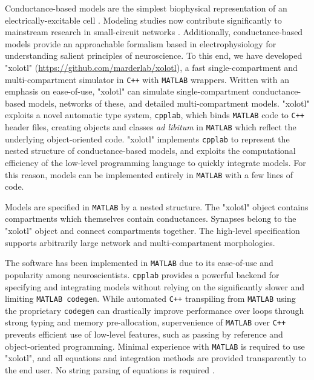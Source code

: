 \documentclass{frontiersSCNS} %
\begin{document}
Conductance-based models are the simplest biophysical representation of an electrically-excitable cell \autocite{hodgkinQuantitativeDescriptionMembrane1952}. Modeling studies now contribute significantly to mainstream research in small-circuit networks \autocite{marderTheoryMotion1995, prinzComputationalApproachesNeuronal2010, prinzInsightsModelsRhythmic2006}. Additionally, conductance-based models provide an approachable formalism based in electrophysiology for understanding salient principles of neuroscience. To this end, we have developed "xolotl" (\url{https://github.com/marderlab/xolotl}), a fast single-compartment and multi-compartment simulator in \texttt{C++} with \texttt{MATLAB} wrappers. Written with an emphasis on ease-of-use, "xolotl" can simulate single-compartment conductance-based models, networks of these, and detailed multi-compartment models. "xolotl" exploits a novel automatic type system, \texttt{cpplab}, which binds \texttt{MATLAB} code to \texttt{C++} header files, creating objects and classes \textit{ad libitum} in \texttt{MATLAB} which reflect the underlying object-oriented code. "xolotl" implements \texttt{cpplab} to represent the nested structure of conductance-based models, and exploits the computational efficiency of the low-level programming language to quickly integrate models. For this reason, models can be implemented entirely in \texttt{MATLAB} with a few lines of code.

Models are specified in \texttt{MATLAB} by a nested structure. The "xolotl" object contains compartments which themselves contain conductances. Synapses belong to the "xolotl" object and connect compartments together. The high-level specification supports arbitrarily large network and multi-compartment morphologies. 

The software has been implemented in \texttt{MATLAB} due to its ease-of-use and popularity among neuroscientists. \texttt{cpplab} provides a powerful backend for specifying and integrating models without relying on the significantly slower and limiting \texttt{MATLAB codegen}. While automated \texttt{C++} transpiling from \texttt{MATLAB} using the proprietary \texttt{codegen} can drastically improve performance over loops through strong typing and memory pre-allocation, supervenience of \texttt{MATLAB} over \texttt{C++} prevents efficient use of low-level features, such as passing by reference and object-oriented programming.   Minimal experience with \texttt{MATLAB} is required to use "xolotl", and all equations and integration methods are provided transparently to the end user. No string parsing of equations is required \autocite{sherfeyDynaSimMATLABToolbox2018, stimbergBrianSecondComing2013, stimbergEquationorientedSpecificationNeural2014}. 
\end{document}
